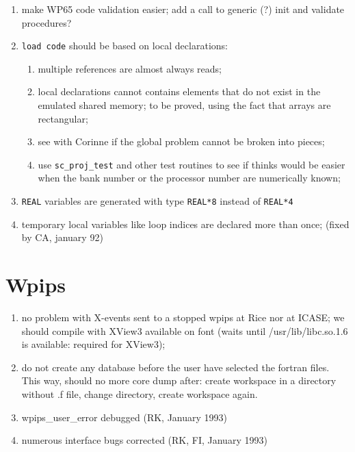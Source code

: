 \begin{enumerate}
  \item make WP65 code validation easier; add a call to generic (?) init
	and validate procedures?

  \item \verb+load code+ should be based on local declarations:

    \begin{enumerate}

	\item multiple references are almost always reads;

	\item local declarations cannot contains elements that
	do not exist in the emulated shared memory; to be proved,
	using the fact that arrays are rectangular;

	\item see with Corinne if the global problem cannot be broken
	into pieces;

	\item use \verb+sc_proj_test+ and other test routines to see
	if thinks would be easier when the bank number or the processor
	number are numerically known;

    \end{enumerate}

  \item {} 
	\verb+REAL+ variables are generated with type \verb+REAL*8+
	instead of \verb+REAL*4+

  \item {} temporary local variables like loop indices are declared
	more than once; (fixed by CA, january 92)

\end{enumerate}

\section{Wpips}

\begin{enumerate}

  \item no problem with X-events sent to a stopped wpips at Rice nor at
	ICASE; we should compile with XView3 available on font (waits
	until /usr/lib/libc.so.1.6 is available: required for XView3);

  \item do not create any database before the user have selected the
	fortran files. This way, should no more core dump after: create
	workspace in a directory without .f file, change directory,
	create workspace again.

  \item wpips_user_error debugged (RK, January 1993)

  \item numerous interface bugs corrected (RK, FI, January 1993)

\end{enumerate}

